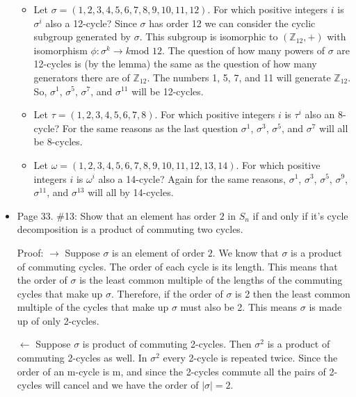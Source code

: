 \documentclass[12pt]{report}
\begin{document}
\begin{itemize}
      \begin{itemize}
      \item Let $\sigma = (1,2,3,4,5,6,7,8,9,10,11,12)$. For which positive integers $i$ is $\sigma^i$ also a 12-cycle?
            Since $\sigma$ has order 12 we can consider the cyclic subgroup generated by $\sigma$. This subgroup is
            isomorphic to $(\mathbb{Z}_12, +)$ with isomorphism $\phi: \sigma^k \to k \textrm{mod 12}$. The question of
            how many powers of $\sigma$ are 12-cycles is (by the lemma) the same as the question of how many generators
            there are of $\mathbb{Z}_12$. The numbers 1, 5, 7, and 11 will generate $\mathbb{Z}_12$. So, $\sigma^1$,
            $\sigma^5$, $\sigma^7$, and $\sigma^11$ will be 12-cycles.

      \item Let $\tau = (1,2,3,4,5,6,7,8)$. For which positive integers $i$ is $\tau^i$ also an 8-cycle?
            For the same reasons as the last question $\sigma^1$, $\sigma^3$, $\sigma^5$, and $\sigma^7$ will all be
            8-cycles.

      \item Let $\omega = (1,2,3,4,5,6,7,8,9,10,11,12,13,14)$. For which positive integers $i$ is $\omega^i$ also a
            14-cycle? Again for the same reasons, $\sigma^1$, $\sigma^3$, $\sigma^5$, $\sigma^9$, $\sigma^11$, and
            $\sigma^13$ will all by 14-cycles.

      \end{itemize}

\item Page 33. \#13: Show that an element has order $2$ in $S_n$ if and only if it's cycle decomposition is a
      product of commuting two cycles.

      Proof:
      $\rightarrow$ Suppose $\sigma$ is an element of order $2$. We know that $\sigma$ is a product of commuting cycles.
      The order of each cycle is its length. This means that the order of $\sigma$ is the least common multiple of the
      lengths of the commuting cycles that make up $\sigma$. Therefore, if the order of $\sigma$ is 2 then the least
      common multiple of the cycles that make up $\sigma$ must also be 2. This means $\sigma$ is made up of only
      2-cycles.

      $\leftarrow$ Suppose $\sigma$ is product of commuting 2-cycles. Then $\sigma^2$ is a product of commuting 2-cycles
      as well. In $\sigma^2$ every 2-cycle is repeated twice. Since the order of an m-cycle is m, and since the 2-cycles
      commute all the pairs of 2-cycles will cancel and we have the order of $|\sigma| = 2$.


\end{itemize}
\end{document}

